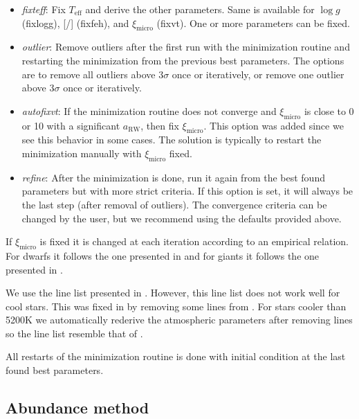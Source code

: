\documentclass{aa}
\begin{document}
\begin{itemize}
    \item \emph{fixteff}: Fix $T_\mathrm{eff}$ and derive the other parameters.
          Same is available for $\log g$ (fixlogg), [/]
          (fixfeh), and $\xi_\mathrm{micro}$ (fixvt). One or more parameters
          can be fixed.
    \item \emph{outlier}: Remove outliers after the first run with the minimization
          routine and restarting the minimization from the previous best
          parameters. The options are to remove all outliers above $3\sigma$
          once or iteratively, or remove one outlier above $3\sigma$ once or
          iteratively.
    \item \emph{autofixvt}: If the minimization routine does not converge and
          $\xi_\mathrm{micro}$ is close to 0 or 10 with a significant
          $a_\mathrm{RW}$, then fix $\xi_\mathrm{micro}$. This option was added
          since we see this behavior in some cases. The solution is typically
          to restart the minimization manually with $\xi_\mathrm{micro}$
          fixed.
    \item \emph{refine}: After the minimization is done, run it again from the best
          found parameters but with more strict criteria. If this option is set,
          it will always be the last step (after removal of outliers). The
          convergence criteria can be changed by the user, but we recommend
          using the defaults provided above.
\end{itemize}
If $\xi_\mathrm{micro}$ is fixed it is changed at each iteration according to
an empirical relation. For dwarfs it follows the one presented in
\citet{Tsantaki2013} and for giants it follows the one presented in
\citet{Adibekyan2015}.

We use the line list presented in \citet{Sousa2008a}. However, this line list
does not work well for cool stars. This was fixed in \citet{Tsantaki2013}
by removing some lines from \citet{Sousa2008a}. For stars cooler than
   {5200}{K} we automatically rederive the atmospheric parameters after
removing lines so the line list resemble that of \citet{Tsantaki2013}.

All restarts of the minimization routine is done with initial condition at
the last found best parameters.


\subsection{Abundance method}
\label{sub:Abundance_method}
\end{document}
